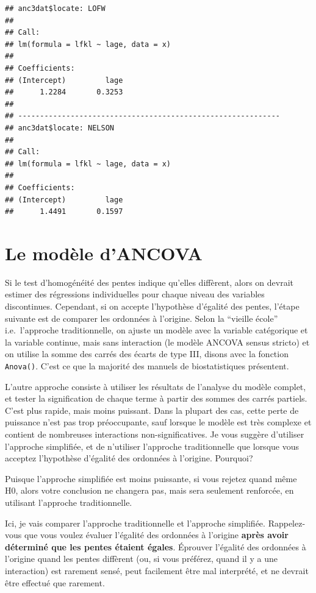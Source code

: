 \documentclass[
  12pt,
]{book}
\begin{document}
\begin{verbatim}
## anc3dat$locate: LOFW        
## 
## Call:
## lm(formula = lfkl ~ lage, data = x)
## 
## Coefficients:
## (Intercept)         lage  
##      1.2284       0.3253  
## 
## ------------------------------------------------------------ 
## anc3dat$locate: NELSON      
## 
## Call:
## lm(formula = lfkl ~ lage, data = x)
## 
## Coefficients:
## (Intercept)         lage  
##      1.4491       0.1597
\end{verbatim}

\hypertarget{le-moduxe8le-dancova}{%
\section{Le modèle d'ANCOVA}\label{le-moduxe8le-dancova}}

Si le test d'homogénéité des pentes indique qu'elles diffèrent, alors on devrait estimer des régressions individuelles pour chaque niveau des variables discontinues. Cependant, si on accepte l'hypothèse d'égalité des pentes, l'étape suivante est de comparer les ordonnées à l'origine. Selon la ``vieille école'' i.e.~l'approche traditionnelle, on ajuste un modèle avec la variable catégorique et la variable continue, mais sans interaction (le modèle ANCOVA sensus stricto) et on utilise la somme des carrés des écarts de type III, disons avec la fonction \texttt{Anova()}. C'est ce que la majorité des manuels de biostatistiques présentent.

L'autre approche consiste à utiliser les résultats de l'analyse du modèle complet, et tester la signification de chaque terme à partir des sommes des carrés partiels. C'est plus rapide, mais moins puissant. Dans la plupart des cas, cette perte de puissance n'est pas trop préoccupante, sauf lorsque le modèle est très complexe et contient de nombreuses interactions non-significatives. Je vous suggère d'utiliser l'approche simplifiée, et de n'utiliser l'approche traditionnelle que lorsque vous acceptez l'hypothèse d'égalité des ordonnées à l'origine. Pourquoi?

Puisque l'approche simplifiée est moins puissante, si vous rejetez quand même H0, alors votre conclusion ne changera pas, mais sera seulement renforcée, en utilisant l'approche traditionnelle.

Ici, je vais comparer l'approche traditionnelle et l'approche simplifiée. Rappelez-vous que vous voulez évaluer l'égalité des ordonnées à l'origine \textbf{après avoir déterminé que les pentes étaient égales}. Éprouver l'égalité des ordonnées à l'origine quand les pentes diffèrent (ou, si vous préférez, quand il y a une interaction) est rarement sensé, peut facilement être mal interprété, et ne devrait être effectué que rarement.
\end{document}
